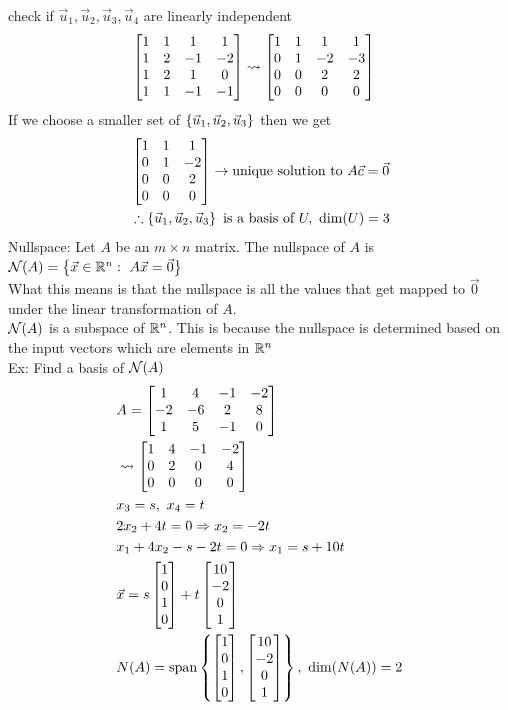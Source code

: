 \documentclass[11pt, fleqn]{article}
\begin{document}
check if $\vec{u}_1,\vec{u}_2,\vec{u}_3,\vec{u}_4$ are linearly independent
\begin{align*}
    &\matrixx{1 & 1 & 1 & 1\\ 1 & 2 & -1 & -2\\ 1 & 2 & 1 & 0\\ 1 & 1 & -1 & -1}\leadsto\matrixx{1 & 1 & 1 & 1\\ 0 & 1 & -2 & -3\\ 0 & 0 & 2 & 2\\ 0 & 0 & 0 & 0}
\end{align*}
If we choose a smaller set of $\left\{ \vec{u}_1,\vec{u}_2,\vec{u}_3 \right\}$ then we get
\begin{align*}
    &\matrixx{1 & 1 & 1\\ 0 & 1 & -2\\ 0 & 0 & 2\\ 0 & 0 & 0}\to \text{unique solution to }A\vec{c}=\vec{0}\\
    &\therefore \brcurly{\vec{u}_1,\vec{u}_2,\vec{u}_3}\text{ is a basis of }U,\ \dim(U)=3
\end{align*}
Nullspace:
Let $A$ be an $m\times n$ matrix. The nullspace of $A$ is $\Null(A)=\brcurly{\vec{x}\in\R^n:\ A\vec{x}=\vec{0}}$\\
What this means is that the nullspace is all the values that get mapped to $\vec{0}$ under the linear transformation of $A$.\\
$\mathcal{N}(A)$ is a subspace of $\mathbb{R}^n$. This is because the nullspace is determined based on the input vectors which are elements in $\mathbb{R}^n$\\
Ex: Find a basis of $\mathcal{N}(A)$
\begin{align*}
    &A=\matrixx{1 & 4 & -1 & -2\\ -2 & -6 & 2 & 8\\ 1 & 5 & -1 & 0}\\
    &\leadsto \matrixx{1 & 4 & -1 & -2\\ 0 & 2 & 0 & 4\\ 0 & 0 & 0 & 0}\\
    &x_3=s,\ x_4=t\\
    &2x_2+4t=0\Ra x_2=-2t\\
    &x_1+4x_2-s-2t=0\Ra x_1=s+10t\\
    &\vec{x}=s\matrixx{1\\0\\1\\0}+t\matrixx{10\\-2\\0\\1}\\
    &N(A)=\spann\brcurly{\matrixx{1\\0\\1\\0},\matrixx{10\\-2\\0\\1}},\ \dim(N(A))=2
\end{align*}
\end{document}
